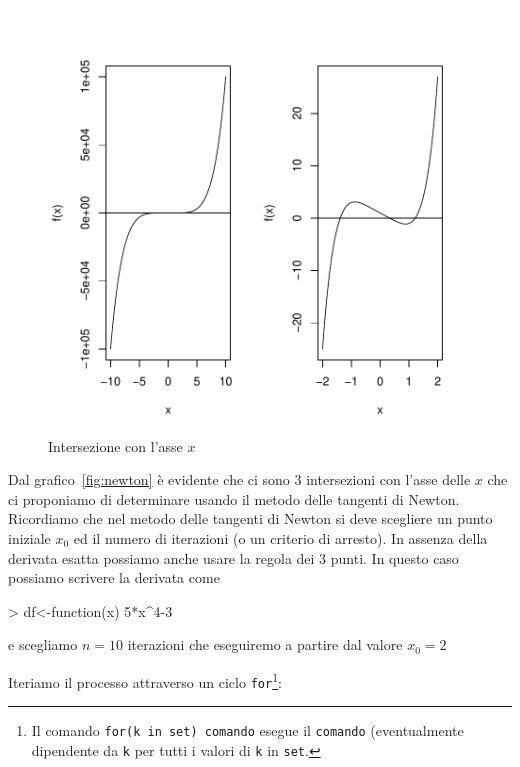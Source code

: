 \documentclass[onecolumn,11pt]{book}
\begin{document}
\begin{figure}[htbp]
\begin{center}
\includegraphics{Rmatematica-143}
\caption{Intersezione con l'asse $x$ }
\label{fig:tnewton}
\end{center}
\end{figure}
Dal grafico~\ref{fig:newton} \`e evidente che ci sono 3 intersezioni con l'asse delle $x$ che ci proponiamo di determinare usando il metodo delle tangenti di Newton. Ricordiamo che nel metodo delle tangenti di Newton si deve scegliere un punto iniziale $x_0$  ed il numero di iterazioni (o un criterio di arresto).  
In assenza della derivata esatta possiamo anche usare la regola dei 3 punti. In questo caso possiamo scrivere la derivata come
\begin{Schunk}
\begin{Sinput}
> df<-function(x) 5*x^4-3
\end{Sinput}
\end{Schunk}
e scegliamo $n=10$ iterazioni che eseguiremo  a partire dal valore $x_0=2$

Iteriamo il processo attraverso un ciclo \texttt{for}\footnote{Il comando   \texttt{for(k in set) comando} esegue il \texttt{comando} (eventualmente dipendente da \texttt{k} per tutti i valori di \texttt{k} in \texttt{set}. }:
\end{document}
